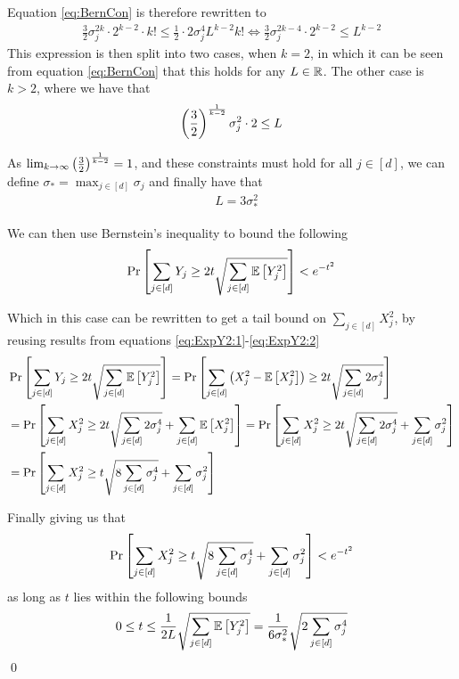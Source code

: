 \documentclass[a4paper,12pt]{article}
\renewenvironment{proof}{{\textit{Proof} \\}}{\qed}
\begin{document}
\begin{proof}
Equation \eqref{eq:BernCon} is therefore rewritten to 
\begin{align*}
    \frac{3}{2}\sigma_j^{2k} \cdot 2^{k-2} \cdot k! \le \frac{1}{2} \cdot 2 \sigma_j^4 L^{k-2} k! 
    \iff \frac{3}{2} \sigma_j^{2k-4} \cdot 2^{k-2} \le L^{k-2}
\end{align*}
This expression is then split into two cases, when $k=2$, in which it can be seen from equation \eqref{eq:BernCon} that this holds for any $L \in \mathbb{R}$.
The other case is $k>2$, where we have that 
\[
    \left (\frac{3}{2}\right)^{\frac{1}{k-2}} \sigma_j^2 \cdot 2 \le L
\]

As $\lim_{k \rightarrow \infty} \left (\frac{3}{2}\right)^{\frac{1}{k-2}} = 1$, 
and these constraints must hold for all $j \in [d]$, we can define $\sigma_* = \max_{j \in [d]} \sigma_j$ and finally have that
\begin{align*}
    &L = 3\sigma_*^2 
\end{align*}

We can then use Bernstein's inequality to bound the following 
\begin{equation}
\label{eq:BernIneq}
    \Pr\left [\sum_{j \in [d]} Y_j \ge 2 t \sqrt{ \sum_{j \in [d]} \mathbb{E} \left [ Y_j^2  \right]} \right] < e^{-t^2}
\end{equation}

Which in this case can be rewritten to get a tail bound on $\sum_{j \in [d]} X_j^2$,
by reusing results from equations \eqref{eq:ExpY2:1}-\eqref{eq:ExpY2:2}
\begin{align*}
&\Pr\left [\sum_{j \in [d]} Y_j \ge 2 t \sqrt{ \sum_{j \in [d]} \mathbb{E} \left [ Y_j^2  \right]} \right] 
=\Pr\left [\sum_{j \in [d]} \left (X_j^2 - \mathbb{E} \left [ X_j^2  \right]\right) \ge 2 t \sqrt{ \sum_{j \in [d]} 2 \sigma_j^4} \right] \\
&=\Pr\left [\sum_{j \in [d]} X_j^2  \ge 2 t \sqrt{ \sum_{j \in [d]} 2 \sigma_j^4} + \sum_{j \in [d]} \mathbb{E} \left [ X_j^2  \right] \right] 
=\Pr\left [\sum_{j \in [d]} X_j^2  \ge 2 t \sqrt{ \sum_{j \in [d]} 2 \sigma_j^4} + \sum_{j \in [d]} \sigma_j^2 \right]  \\
&=\Pr\left [\sum_{j \in [d]} X_j^2  \ge 
    t \sqrt{ 8 \sum_{j \in [d]}  \sigma_j^4} +
    \sum_{j \in [d]} \sigma_j^2  \right] \\
\end{align*}

Finally giving us that 
\[
\Pr\left [\sum_{j \in [d]} X_j^2  \ge 
    t \sqrt{ 8 \sum_{j \in [d]}  \sigma_j^4} +
    \sum_{j \in [d]} \sigma_j^2  \right] < e^{-t^2}
\]
as long as $t$ lies within the following bounds
\[
    0 \le t \le \frac{1}{2L} \sqrt{\sum_{j \in [d]} \mathbb{E} \left [ Y_j^2  \right]} =
    \frac{1}{6 \sigma_*^2} \sqrt{2 \sum_{j \in [d]} \sigma_j^4}
\]
\end{proof}
\end{document}
